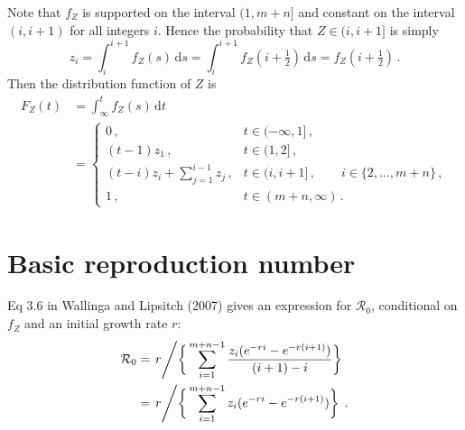\documentclass[12pt]{article}
\begin{document}
Note that $f_Z$ is supported on the interval $(1,m+n]$ and constant
on the interval $(i,i+1)$ for all integers $i$. Hence the probability
that $Z \in (i,i+1]$ is simply
%
\begin{equation}
    z_i = \int_{i}^{i+1} f_Z(s)\,\text{d}s = \int_{i}^{i+1} f_Z(i+\tfrac{1}{2})\,\text{d}s = f_Z(i+\tfrac{1}{2})\,.
\end{equation}
%
Then the distribution function of $Z$ is
%
\begin{equation}
  \begin{aligned}
    F_Z(t)
    &= \int_{\infty}^{t} f_Z(s)\,\text{d}t \\
    &= \begin{cases}
      0\,, & t \in (-\infty,1]\,, \\
      (t-1) z_1\,, & t \in (1,2]\,, \\
      (t-i) z_i + \sum_{j=1}^{i-1} z_j\,, & t \in (i,i+1]\,,\qquad i \in \{2,\ldots,m+n\}\,, \\
      1\,, & t \in (m+n,\infty)\,.
    \end{cases}
  \end{aligned}
\end{equation}

            
\section{Basic reproduction number}

Eq 3.6 in Wallinga and Lipsitch (2007) gives an expression for 
$\mathcal{R}_0$, conditional on $f_Z$ and an initial growth rate $r$:
%
\begin{equation}
  \begin{aligned}
    \mathcal{R}_0
    &= \left. r \middle/ \bigg\{\sum_{i=1}^{m+n-1} \frac{z_i (e^{-r i} - e^{-r (i+1)})}{(i+1) - i}\bigg\} \right. \\
    &= \left. r \middle/ \bigg\{\sum_{i=1}^{m+n-1} z_i (e^{-r i} - e^{-r (i+1)})\bigg\} \right.\,.
   \end{aligned}
\end{equation}
\end{document}
